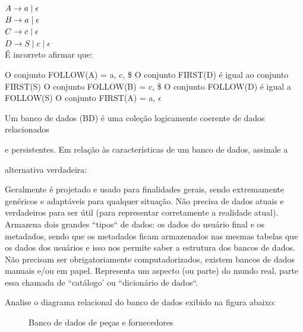 \documentclass[12pt, addpoints]{exam}
\begin{document}
\begin{questions}
$A \rightarrow a \mid \epsilon \\$\\

$B \rightarrow a \mid \epsilon \\$\\

$C \rightarrow c \mid \epsilon \\$\\

$D \rightarrow S \mid c \mid \epsilon$\\



É incorreto afirmar que:
\begin{choices}
\choice O conjunto FOLLOW(A) = a, c, \$
\choice O conjunto FIRST(D) é igual ao conjunto FIRST(S)
\choice O conjunto FOLLOW(B) = c, \$
\choice O conjunto FOLLOW(D) é igual a FOLLOW(S)
\choice O conjunto FIRST(A) = a, \(\epsilon\)
\end{choices}

\question

Um banco de dados (BD) é uma coleção logicamente coerente de dados relacionados

e persistentes. Em relação às características de um banco de dados, assinale a

alternativa verdadeira:
\begin{choices}
\choice Geralmente é projetado e usado para finalidades gerais, sendo extremamente genéricos e adaptáveis para qualquer situação.
\choice Não precisa de dados atuais e verdadeiros para ser útil (para representar corretamente a realidade atual).
\choice Armazena dois grandes ``tipos`` de dados: os dados do usuário final e os metadados, sendo que os metadados ficam armazenados nas mesmas tabelas que os dados dos usuários e isso nos permite saber a estrutura dos bancos de dados.
\choice Não precisam ser obrigatoriamente computadorizados, existem bancos de dados manuais e/ou em papel.
\choice Representa um aspecto (ou parte) do mundo real, parte essa chamada de ``catálogo' ou ``dicionário de dados``.
\end{choices}

\question

Analise o diagrama relacional do banco de dados exibido na figura abaixo:

\begin{figure}[H]

  \centering

  \caption{Banco de dados de peças e fornecedores}


\end{figure}
\end{questions}
\end{document}
